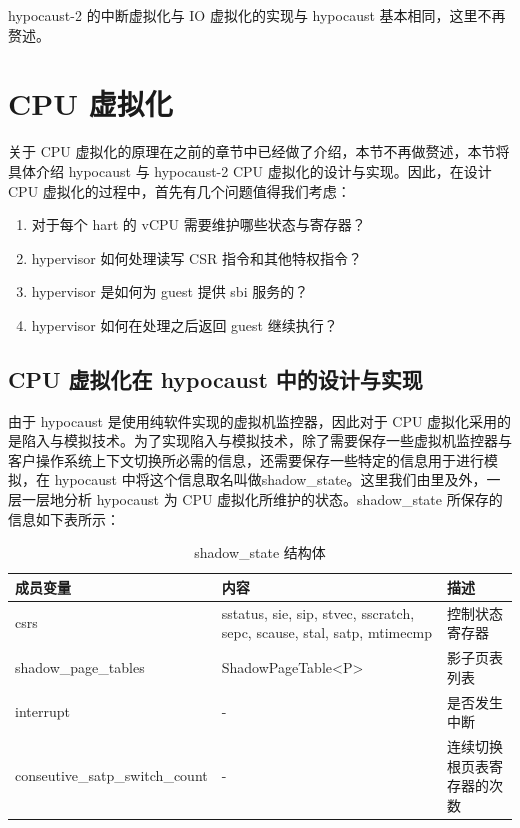 hypocaust-2 的中断虚拟化与 IO 虚拟化的实现与 hypocaust 基本相同，这里不再赘述。

\section{CPU 虚拟化}
关于 CPU 虚拟化的原理在之前的章节中已经做了介绍，本节不再做赘述，本节将具体介绍 hypocaust 与 hypocaust-2 CPU 虚拟化的设计与实现。因此，在设计 CPU 虚拟化的过程中，首先有几个问题值得我们考虑：
\begin{enumerate}
    \item 对于每个 hart 的 vCPU 需要维护哪些状态与寄存器？
    \item hypervisor 如何处理读写 CSR 指令和其他特权指令？
    \item hypervisor 是如何为 guest 提供 sbi 服务的？
    \item hypervisor 如何在处理之后返回 guest 继续执行？
\end{enumerate}


\subsection{CPU 虚拟化在 hypocaust 中的设计与实现}
由于 hypocaust 是使用纯软件实现的虚拟机监控器，因此对于 CPU 虚拟化采用的是陷入与模拟技术。为了实现陷入与模拟技术，除了需要保存一些虚拟机监控器与客户操作系统上下文切换所必需的信息，还需要保存一些特定的信息用于进行模拟，在 hypocaust 中将这个信息取名叫做shadow\_state。这里我们由里及外，一层一层地分析 hypocaust 为 CPU 虚拟化所维护的状态。shadow\_state 所保存的信息如下表所示：


\begin{table}[htbp]
\caption{shadow\_state 结构体}\label{tab:table1}
\vspace{0.5em}\centering\wuhao
\begin{tabular}{p{5cm}p{5cm}p{5cm}}
\toprule[1.5pt]
成员变量 & 内容 & 描述\\
\midrule[1pt]
csrs & sstatus, sie, sip, stvec, sscratch, sepc, scause, stal, satp, mtimecmp & 控制状态寄存器\\
shadow\_page\_tables & ShadowPageTable<P> & 影子页表列表\\
interrupt &  - & 是否发生中断 \\
conseutive\_satp\_switch\_count & - & 连续切换根页表寄存器的次数 \\
\bottomrule[1.5pt]
\end{tabular}
\vspace{\baselineskip}
\end{table}

